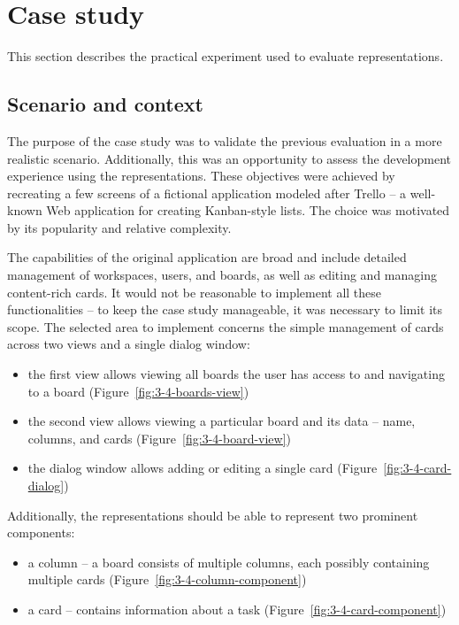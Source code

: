 \section{Case study}\label{sec:case-study}
This section describes the practical experiment used to evaluate representations.

\subsection{Scenario and context}\label{subsec:scenario-and-context}
The purpose of the case study was to validate the previous evaluation in a more realistic scenario.
Additionally, this was an opportunity to assess the development experience using the representations.
These objectives were achieved by recreating a few screens of a fictional application modeled after Trello -- a well-known Web application for creating Kanban-style lists.
The choice was motivated by its popularity and relative complexity.

The capabilities of the original application are broad and include detailed management of workspaces, users, and boards, as well as editing and managing content-rich cards.
It would not be reasonable to implement all these functionalities -- to keep the case study manageable, it was necessary to limit its scope.
The selected area to implement concerns the simple management of cards across two views and a single dialog window:
\begin{itemize}
    \item the first view allows viewing all boards the user has access to and navigating to a board (Figure~\ref{fig:3-4-boards-view})
    \item the second view allows viewing a particular board and its data -- name, columns, and cards (Figure~\ref{fig:3-4-board-view})
    \item the dialog window allows adding or editing a single card (Figure~\ref{fig:3-4-card-dialog})
\end{itemize}
Additionally, the representations should be able to represent two prominent components:
\begin{itemize}
    \item a column -- a board consists of multiple columns, each possibly containing multiple cards (Figure~\ref{fig:3-4-column-component})
    \item a card -- contains information about a task (Figure~\ref{fig:3-4-card-component})
\end{itemize}

